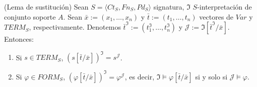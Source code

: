 \begin{theorem}(Lema de sustitución)\label{sustprim}
Sean $S = \langle Ct_{S}, Fn_{S}, Pd_{S}\rangle$ signatura, $\mathfrak{I}$ $S$-interpretación de conjunto soporte $A$. Sean $\bar{x} := (x_1, \dots, x_n)$ y $\bar{t} := (t_1, \dots, t_n)$ vectores de $Var$ y $TERM_S$, respectivamente. Denotemos $\bar{t}^{\mathfrak{I}} := (t_1^{\mathfrak{I}}, \dots, t_n^{\mathfrak{I}})$ y $\mathcal{J} := \mathfrak{I}[\bar{t}^{\mathfrak{I}}/\bar{x}]$.
Entonces:
\begin{enumerate}
    \item Si $s \in TERM_S$, $(s[\bar{t}/\bar{x}])^{\mathfrak{I}} = s^{\mathcal{J}}$.
    \item Si $\varphi \in FORM_S$, $(\varphi[\bar{t}/\bar{x}])^{\mathfrak{I}} = \varphi^{\mathcal{J}}$, es decir, $\mathfrak{I} \vDash \varphi[\bar{t}/\bar{x}]$ si y solo si $\mathcal{J} \vDash \varphi$.
\end{enumerate}
\end{theorem}
